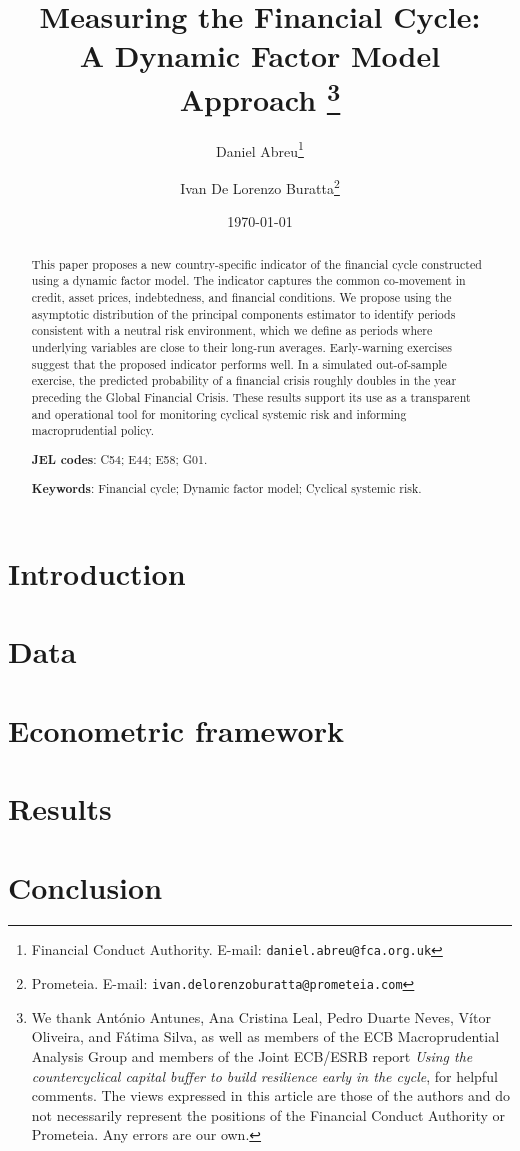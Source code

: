 \documentclass[a4paper,12pt]{article}
\title{%
  \textbf{Measuring the Financial Cycle:\\A Dynamic Factor Model Approach}%
  \thanks{We thank António Antunes, Ana Cristina Leal, Pedro Duarte Neves,
  Vítor Oliveira, and Fátima Silva, as well as members of the ECB
  Macroprudential Analysis Group and members of the Joint ECB/ESRB report
  \textit{Using the countercyclical capital buffer to build resilience early
  in the cycle}, for helpful comments. The views expressed in this article
  are those of the authors and do not necessarily represent the positions of
  the Financial Conduct Authority or Prometeia. Any errors are our own.
}}
\author{
  Daniel Abreu\thanks{Financial Conduct Authority. E-mail: \texttt{daniel.abreu@fca.org.uk}} \and
  Ivan De Lorenzo Buratta\thanks{Prometeia. E-mail: \texttt{ivan.delorenzoburatta@prometeia.com}}
}
\date{\today}
\begin{document}
\maketitle

\begin{abstract}
\noindent
This paper proposes a new country-specific indicator of the financial cycle constructed using a dynamic factor model. The indicator captures the common co-movement in credit, asset prices, indebtedness, and financial conditions. We propose using the asymptotic distribution of the principal components estimator to identify periods consistent with a neutral risk environment, which we define as periods where underlying variables are close to their long-run averages. Early-warning exercises suggest that the proposed indicator performs well. In a simulated out-of-sample exercise, the predicted probability of a financial crisis roughly doubles in the year preceding the Global Financial Crisis. These results support its use as a transparent and operational tool for monitoring cyclical systemic risk and informing macroprudential policy.

\vspace{0.25cm}

\textbf{JEL codes}: C54; E44; E58; G01.

\textbf{Keywords}: Financial cycle; Dynamic factor model; Cyclical systemic risk.
\end{abstract}

\newpage

\section{Introduction\label{Intro}}
\section{Data\label{Data}}
\section{Econometric framework\label{Method}}
\section{Results\label{Results}}
\section{Conclusion\label{Conclusion}}
\end{document}
